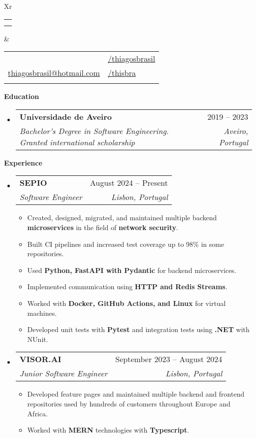 \documentclass[letterpaper,12pt]{article}[leftmargin=*]
\makeatletter
\def \fullname {Thiago S. Brasil}
\def \subtitle {}
\def \linkedinicon {\faLinkedin}
\def \linkedinlink {https://linkedin.com/in/thiagosbrasil/}
\def \linkedintext {/thiagosbrasil}
\def \phoneicon {\faPhone}
\def \phonetext {+351 933311220}
\def \emailicon {\faEnvelope}
\def \emaillink {mailto:thiagosbrasil@hotmail.com}
\def \emailtext {thiagosbrasil@hotmail.com}
\def \githubicon {\faGithub}
\def \githublink {https://github.com/thisbra}
\def \githubtext {/thisbra}
\def \headertype {\doublecol} %
\def \entryspacing {-4pt}
\def \linkedin {\linkedinicon \hspace{3pt}\href{\linkedinlink}{\linkedintext}}
\def \phone {\phoneicon \hspace{3pt}{ \phonetext}}
\def \email {\emailicon \hspace{3pt}\href{\emaillink}{\emailtext}}
\def \github {\githubicon \hspace{3pt}\href{\githublink}{\githubtext}}
\def \website {\websiteicon \hspace{3pt}\href{\websitelink}{\websitetext}}
\renewcommand{\section}[2]{\vspace{5pt}
  \colorbox{secondary}{\color{white}\raggedbottom\normalsize\textbf{{#1}{\hspace{7pt}#2}}}
}
\newcommand{\resumeEntryStart}{\begin{itemize}[leftmargin=2.5mm]}
\newcommand{\resumeEntryEnd}{\end{itemize}\vspace{\entryspacing}}
\newcommand{\resumeItemListStart}{\begin{itemize}[leftmargin=4.5mm]}
\newcommand{\resumeItemListEnd}{\end{itemize}}
\newcommand{\resumeItem}[1]{
  \item\small{
    {#1 \vspace{-2pt}}
  }
}
\newcommand{\resumeEntryTSDL}[4]{
  \vspace{-1pt}\item[]
    \begin{tabularx}{0.97\textwidth}{X@{\hspace{60pt}}r}
      \textbf{\color{primary}#1} & {\firabook\color{accent}\small#2} \\
      \textit{\color{accent}\small#3} & \textit{\color{accent}\small#4} \\
    \end{tabularx}\vspace{-6pt}
}
\newcommand{\doublecol}[6]{
  \begin{tabularx}{\textwidth}{Xr}
    {
      \begin{tabular}[c]{l}
        \fontsize{35}{45}\selectfont{\color{primary}{{\textbf{\fullname}}}} \\
        {\textit{\subtitle}} %
      \end{tabular}
    } & {
      \begin{tabular}[c]{l@{\hspace{1.5em}}l}
        {\small#4} & {\small#1} \\
        {\small#5} & {\small#2} \\
        {\small#6} & {\small#3}
      \end{tabular}
    }
  \end{tabularx}
}
\newcommand{\singlecol}[6]{
  \begin{tabularx}{\textwidth}{Xr}
    {
      \begin{tabular}[b]{l}
        \fontsize{35}{45}\selectfont{\color{primary}{{\textbf{\fullname}}}} \\
        {\textit{\subtitle}} %
      \end{tabular}
    } & {
      \begin{tabular}[c]{l}
        {\small#1} \\
        {\small#2} \\
        {\small#3} \\
        {\small#4} \\
        {\small#5} \\
        {\small#6}
      \end{tabular}
    }
  \end{tabularx}
}
\makeatother
\begin{document}


\headertype{\linkedin}{\github}{\website}{\phone}{\email}{} %
\vspace{-10pt} %

\section{\faGraduationCap}{Education}

  \resumeEntryStart
    \resumeEntryTSDL
      {Universidade de Aveiro}{2019 -- 2023}
      {Bachelor's Degree in Software Engineering. Granted international scholarship}{Aveiro, Portugal}
  \resumeEntryEnd


\section{\faPieChart}{Experience}

 \resumeEntryStart
    \resumeEntryTSDL
      {SEPIO}{August 2024 -- Present}
      {Software Engineer}{Lisbon, Portugal}
    \resumeItemListStart
      \resumeItem {Created, designed, migrated, and maintained multiple backend \textbf{microservices} in the field of \textbf{network security}.}
      \resumeItem {Built CI pipelines and increased test coverage up to 98\% in some repositories.}
      \resumeItem {Used \textbf{Python, FastAPI with Pydantic} for backend microservices.}
      \resumeItem {Implemented communication using \textbf{HTTP and Redis Streams}.}
      \resumeItem {Worked with \textbf{Docker, GitHub Actions, and Linux} for virtual machines.}
      \resumeItem {Developed unit tests with \textbf{Pytest} and integration tests using \textbf{.NET} with NUnit.}
    \resumeItemListEnd
  \resumeEntryEnd

  \resumeEntryStart
    \resumeEntryTSDL
      {VISOR.AI}{September 2023 -- August 2024}
      {Junior Software Engineer}{Lisbon, Portugal}
    \resumeItemListStart
      \resumeItem {Developed feature pages and maintained multiple backend and frontend repositories used by hundreds of customers throughout Europe and Africa.}
      \resumeItem {Worked with \textbf{MERN} technologies with \textbf{Typescript}.}
    \resumeItemListEnd
  \resumeEntryEnd
\end{document}

